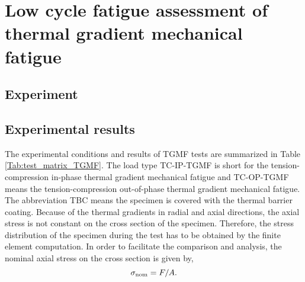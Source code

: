 \chapter{Low cycle fatigue assessment of thermal gradient mechanical fatigue}


\section{Experiment}


\section{Experimental results}
\noindent
The experimental conditions and results of TGMF tests are summarized in Table \ref{Tab:test_matrix_TGMF}. The load type TC-IP-TGMF is short for the tension-compression in-phase thermal gradient mechanical fatigue and TC-OP-TGMF means the tension-compression out-of-phase thermal gradient mechanical fatigue. The abbreviation TBC means the specimen is covered with the thermal barrier coating.
Because of the thermal gradients in radial and axial directions, the axial stress is not constant on the cross section of the specimen.
Therefore, the stress distribution of the specimen during the test has to be obtained by the finite element computation.
In order to facilitate the comparison and analysis, the nominal axial stress on the cross section is given by,
\[\sigma_{\rm{nom}} = F/A.\]

